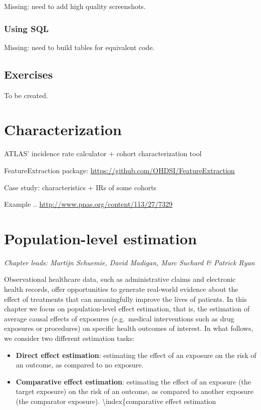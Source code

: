 \documentclass[11pt]{book}
\providecommand{\tightlist}{%
  \setlength{\itemsep}{0pt}\setlength{\parskip}{0pt}}
\theoremstyle{definition}
\theoremstyle{definition}
\theoremstyle{definition}
\theoremstyle{remark}
\begin{document}
Missing: need to add high quality screenshots.

\hypertarget{using-sql}{%
\subsection{Using SQL}\label{using-sql}}

Missing: need to build tables for equivalent code.

\hypertarget{exercises-3}{%
\section{Exercises}\label{exercises-3}}

To be created.

\hypertarget{Characterization}{%
\chapter{Characterization}\label{Characterization}}

ATLAS' incidence rate calculator + cohort characterization tool

FeatureExtraction package: \url{https://github.com/OHDSI/FeatureExtraction}

Case study: characteristics + IRs of some cohorts

Example .. \url{http://www.pnas.org/content/113/27/7329}

\hypertarget{PopulationLevelEstimation}{%
\chapter{Population-level estimation}\label{PopulationLevelEstimation}}

\emph{Chapter leads: Martijn Schuemie, David Madigan, Marc Suchard \& Patrick Ryan}


Observational healthcare data, such as administrative claims and electronic health records, offer opportunities to generate real-world evidence about the effect of treatments that can meaningfully improve the lives of patients. In this chapter we focus on population-level effect estimation, that is, the estimation of average causal effects of exposures (e.g.~medical interventions such as drug exposures or procedures) on specific health outcomes of interest. In what follows, we consider two different estimation tasks:

\begin{itemize}
\tightlist
\item
  \textbf{Direct effect estimation}: estimating the effect of an exposure on the risk of an outcome, as compared to no exposure. 
\item
  \textbf{Comparative effect estimation}: estimating the effect of an exposure (the target exposure) on the risk of an outcome, as compared to another exposure (the comparator exposure). \textbackslash index\{comparative effect estimation
\end{itemize}
\end{document}
